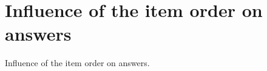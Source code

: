 \clearpage
\section{Influence of the item order on answers}\label{app:order}

\begin{table}[!htbp] 
  \caption[Influence of the item order on answers]{Influence of the item order on answers.}\label{tab:order} 
  \makebox[\textwidth][c]{\resizebox{.98\paperwidth}{!}{}}
\end{table}